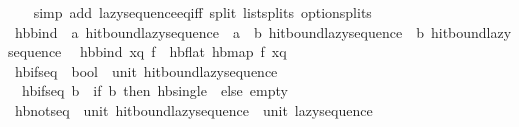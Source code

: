 \begin{isabellebody}
%
\isadelimproof
\ \ %
\endisadelimproof
%
\isatagproof
{}\isamarkupfalse%
\ {\isacharparenleft}{\kern0pt}simp\ add{\isacharcolon}{\kern0pt}\ lazy{\isacharunderscore}{\kern0pt}sequence{\isacharunderscore}{\kern0pt}eq{\isacharunderscore}{\kern0pt}iff\ split{\isacharcolon}{\kern0pt}\ list{\isachardot}{\kern0pt}splits\ option{\isachardot}{\kern0pt}splits{\isacharparenright}{\kern0pt}%
\endisatagproof
{\isafoldproof}%
%
\isadelimproof
\isanewline
%
\endisadelimproof
\isanewline
{}\isamarkupfalse%
\ hb{\isacharunderscore}{\kern0pt}bind\ {\isacharcolon}{\kern0pt}{\isacharcolon}{\kern0pt}\ {\isachardoublequoteopen}{\isacharprime}{\kern0pt}a\ hit{\isacharunderscore}{\kern0pt}bound{\isacharunderscore}{\kern0pt}lazy{\isacharunderscore}{\kern0pt}sequence\ {\isasymRightarrow}\ {\isacharparenleft}{\kern0pt}{\isacharprime}{\kern0pt}a\ {\isasymRightarrow}\ {\isacharprime}{\kern0pt}b\ hit{\isacharunderscore}{\kern0pt}bound{\isacharunderscore}{\kern0pt}lazy{\isacharunderscore}{\kern0pt}sequence{\isacharparenright}{\kern0pt}\ {\isasymRightarrow}\ {\isacharprime}{\kern0pt}b\ hit{\isacharunderscore}{\kern0pt}bound{\isacharunderscore}{\kern0pt}lazy{\isacharunderscore}{\kern0pt}sequence{\isachardoublequoteclose}\isanewline
{}\isanewline
\ \ {\isachardoublequoteopen}hb{\isacharunderscore}{\kern0pt}bind\ xq\ f\ {\isacharequal}{\kern0pt}\ hb{\isacharunderscore}{\kern0pt}flat\ {\isacharparenleft}{\kern0pt}hb{\isacharunderscore}{\kern0pt}map\ f\ xq{\isacharparenright}{\kern0pt}{\isachardoublequoteclose}\isanewline
\isanewline
{}\isamarkupfalse%
\ hb{\isacharunderscore}{\kern0pt}if{\isacharunderscore}{\kern0pt}seq\ {\isacharcolon}{\kern0pt}{\isacharcolon}{\kern0pt}\ {\isachardoublequoteopen}bool\ {\isasymRightarrow}\ unit\ hit{\isacharunderscore}{\kern0pt}bound{\isacharunderscore}{\kern0pt}lazy{\isacharunderscore}{\kern0pt}sequence{\isachardoublequoteclose}\isanewline
{}\isanewline
\ \ {\isachardoublequoteopen}hb{\isacharunderscore}{\kern0pt}if{\isacharunderscore}{\kern0pt}seq\ b\ {\isacharequal}{\kern0pt}\ {\isacharparenleft}{\kern0pt}if\ b\ then\ hb{\isacharunderscore}{\kern0pt}single\ {\isacharparenleft}{\kern0pt}{\isacharparenright}{\kern0pt}\ else\ empty{\isacharparenright}{\kern0pt}{\isachardoublequoteclose}\isanewline
\isanewline
{}\isamarkupfalse%
\ hb{\isacharunderscore}{\kern0pt}not{\isacharunderscore}{\kern0pt}seq\ {\isacharcolon}{\kern0pt}{\isacharcolon}{\kern0pt}\ {\isachardoublequoteopen}unit\ hit{\isacharunderscore}{\kern0pt}bound{\isacharunderscore}{\kern0pt}lazy{\isacharunderscore}{\kern0pt}sequence\ {\isasymRightarrow}\ unit\ lazy{\isacharunderscore}{\kern0pt}sequence{\isachardoublequoteclose}\isanewline

\end{isabellebody}

